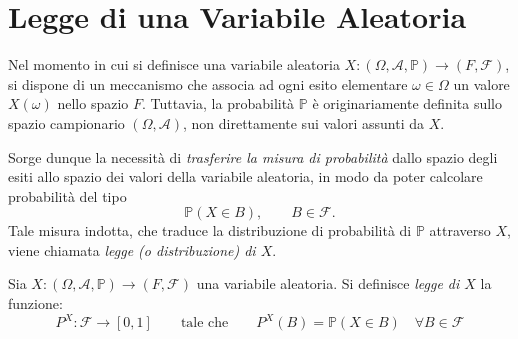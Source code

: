 \section{Legge di una Variabile Aleatoria}
Nel momento in cui si definisce una variabile aleatoria $X : (\Omega, \mathcal{A}, \mathbb{P}) \to (F, \mathcal{F})$, si dispone di un meccanismo che associa ad ogni esito elementare $\omega \in \Omega$ un valore $X(\omega)$ nello spazio $F$. Tuttavia, la probabilità $\mathbb{P}$ è originariamente definita sullo spazio campionario $(\Omega, \mathcal{A})$,
non direttamente sui valori assunti da $X$.
\begin{figure}[H]
    \centering
\end{figure}

\noindent Sorge dunque la necessità di \emph{trasferire la misura di probabilità} dallo spazio degli esiti
allo spazio dei valori della variabile aleatoria,
in modo da poter calcolare probabilità del tipo
\[
\mathbb{P}(X \in B), \qquad B \in \mathcal{F}.
\]
Tale misura indotta, che traduce la distribuzione di probabilità di $\mathbb{P}$ attraverso $X$,
viene chiamata \emph{legge (o distribuzione) di $X$}.

\begin{definizione}
    Sia $X : (\Omega, \mathcal{A}, \mathbb{P}) \to (F, \mathcal{F})$ una variabile aleatoria. Si definisce \textit{legge di $X$} la funzione:
    \[P^X:\mathcal{F}\to [0, 1]\qquad \text{tale che}\qquad P^X(B) = \mathbb{P}(X\in B)\quad \forall B\in\mathcal{F}\]
\end{definizione}

